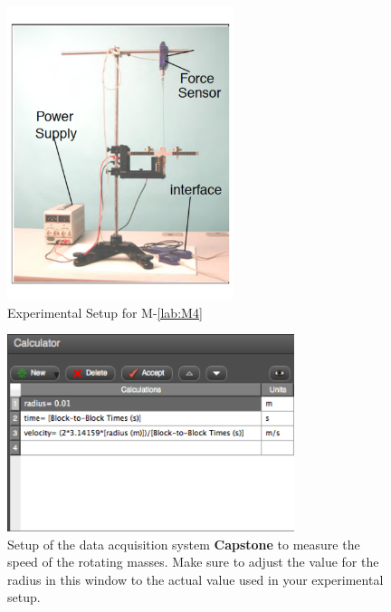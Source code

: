 \begin{figure}
  \begin{center}
    \includegraphics[width=2.6in]{Experiment08Figures/Figure02.pdf}
  \end{center}
  \caption{Experimental Setup for M-\ref{lab:M4}}
  \label{M04Fig02}
\end{figure}

\begin{figure}
  \begin{center}
    \includegraphics[width=3.3in]{Experiment08Figures/Figure03.pdf}
  \end{center}
  \caption{Setup of the data acquisition system \textbf{Capstone} to measure the speed of the rotating masses. Make sure to adjust the value for the radius in this window to the actual value used in your experimental setup.}
  \label{M04Fig03}
\end{figure}


